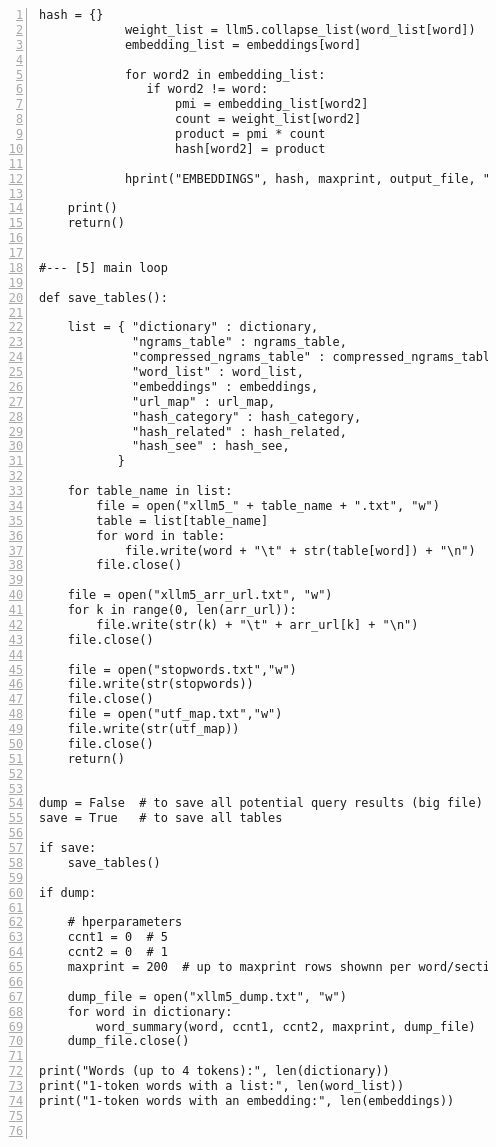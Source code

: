 \documentclass[oneside,10pt]{book}
\begin{document}
\begin{lstlisting}[numbers=left]
            hash = {}
            weight_list = llm5.collapse_list(word_list[word])
            embedding_list = embeddings[word]

            for word2 in embedding_list:
               if word2 != word:
                   pmi = embedding_list[word2]
                   count = weight_list[word2]
                   product = pmi * count
                   hash[word2] = product 
            
            hprint("EMBEDDINGS", hash, maxprint, output_file, "%8.2f %s")

    print()
    return()


#--- [5] main loop 

def save_tables(): 
   
    list = { "dictionary" : dictionary,
             "ngrams_table" : ngrams_table,
             "compressed_ngrams_table" : compressed_ngrams_table,
             "word_list" : word_list,
             "embeddings" : embeddings,
             "url_map" : url_map,
             "hash_category" : hash_category,
             "hash_related" : hash_related,
             "hash_see" : hash_see,
           }

    for table_name in list:
        file = open("xllm5_" + table_name + ".txt", "w")
        table = list[table_name]
        for word in table:
            file.write(word + "\t" + str(table[word]) + "\n")
        file.close()

    file = open("xllm5_arr_url.txt", "w")
    for k in range(0, len(arr_url)):
        file.write(str(k) + "\t" + arr_url[k] + "\n")
    file.close()

    file = open("stopwords.txt","w")
    file.write(str(stopwords))
    file.close()
    file = open("utf_map.txt","w")
    file.write(str(utf_map))
    file.close()
    return()


dump = False  # to save all potential query results (big file)
save = True   # to save all tables

if save:
    save_tables()
 
if dump:

    # hperparameters 
    ccnt1 = 0  # 5
    ccnt2 = 0  # 1
    maxprint = 200  # up to maxprint rows shownn per word/section
    
    dump_file = open("xllm5_dump.txt", "w")
    for word in dictionary:
        word_summary(word, ccnt1, ccnt2, maxprint, dump_file)
    dump_file.close()
     
print("Words (up to 4 tokens):", len(dictionary))
print("1-token words with a list:", len(word_list))
print("1-token words with an embedding:", len(embeddings))



\end{lstlisting}
\end{document}
